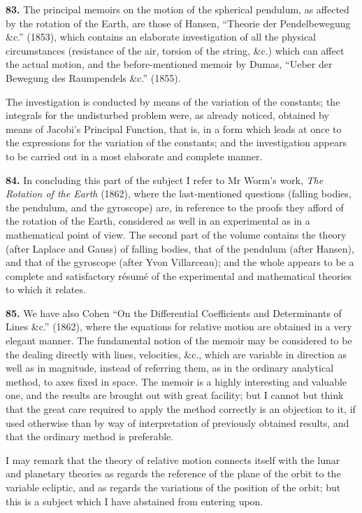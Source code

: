\documentclass[11pt,a4paper]{article}
\theoremstyle{definition}
\begin{document}
\textbf{83.} The principal memoirs on the motion of the spherical pendulum, as affected by the rotation of the Earth, are those of Hansen, ``Theorie der Pendelbewegung \&c.'' (1853), which contains an elaborate investigation of all the physical circumstances (resistance of the air, torsion of the string, \&c.) which can affect the actual motion, and the before-mentioned memoir by Dumas, ``Ueber der Bewegung des Raumpendels \&c.'' (1855).

The investigation is conducted by means of the variation of the constants; the integrals for the undisturbed problem were, as already noticed, obtained by means of Jacobi's Principal Function, that is, in a form which leads at once to the expressions for the variation of the constants; and the investigation appears to be carried out in a most elaborate and complete manner.

\textbf{84.} In concluding this part of the subject I refer to Mr Worm's work, \textit{The Rotation of the Earth} (1862), where the last-mentioned questions (falling bodies, the pendulum, and the gyroscope) are, in reference to the proofs they afford of the rotation of the Earth, considered as well in an experimental as in a mathematical point of view. The second part of the volume contains the theory (after Laplace and Gauss) of falling bodies, that of the pendulum (after Hansen), and that of the gyroscope (after Yvon Villarceau); and the whole appears to be a complete and satisfactory r\'esum\'e of the experimental and mathematical theories to which it relates.

\textbf{85.} We have also Cohen ``On the Differential Coefficients and Determinants of Lines \&c.'' (1862), where the equations for relative motion are obtained in a very elegant manner. The fundamental notion of the memoir may be considered to be the dealing directly with lines, velocities, \&c., which are variable in direction as well as in magnitude, instead of referring them, as in the ordinary analytical method, to axes fixed in space. The memoir is a highly interesting and valuable one, and the results are brought out with great facility; but I cannot but think that the great care required to apply the method correctly is an objection to it, if used otherwise than by way of interpretation of previously obtained results, and that the ordinary method is preferable.

I may remark that the theory of relative motion connects itself with the lunar and planetary theories as regards the reference of the plane of the orbit to the variable ecliptic, and as regards the variations of the position of the orbit; but this is a subject which I have abstained from entering upon.
\end{document}
